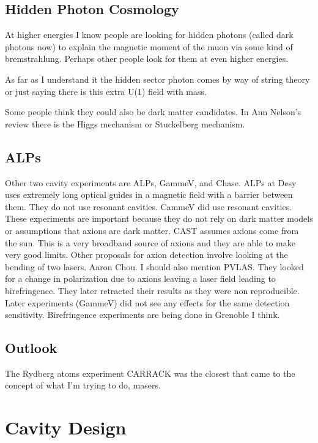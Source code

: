 \documentclass[11pt]{book}
\begin{document}
\subsection{Hidden Photon Cosmology}

At higher energies I know people are looking for hidden photons (called dark photons now) to explain the magnetic moment of the muon via some kind of bremstrahlung. Perhaps other people look for them at even higher energies.

As far as I understand it the hidden sector photon comes by way of string theory or just saying there is this extra U(1) field with mass.

Some people think they could also be dark matter candidates. In Ann Nelson's review there is the Higgs mechanism or Stuckelberg mechanism.

\subsection{ALPs}

Other two cavity experiments are ALPs, GammeV, and Chase. ALPs at Desy uses extremely long optical guides in a magnetic field with a barrier between them. They do not use resonant cavities. CammeV did use resonant cavities.
These experiments are important because they do not rely on dark matter models or assumptions that axions are dark matter.
CAST assumes axions come from the sun. This is a very broadband source of axions and they are able to make very good limits.
Other proposals for axion detection involve looking at the bending of two lasers. Aaron Chou.
I should also mention PVLAS. They looked for a change in polarization due to axions leaving a laser field leading to birefringence. They later retracted their results as they were non reproducible. Later experiments (GammeV) did not see any effects for the same detection sensitivity.
Birefringence experiments are being done in Grenoble I think.

\subsection{Outlook}

The Rydberg atoms experiment CARRACK was the closest that came to the concept of what I'm trying to do, masers.

\section{Cavity Design}
\end{document}
